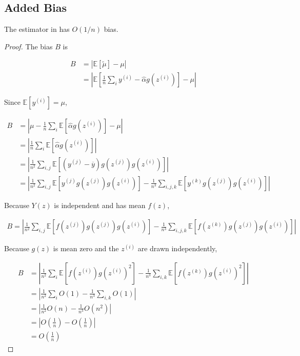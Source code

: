 \subsection{Added Bias}

\begin{prop}[\ref{prop:price:added_bias}]
The estimator in  has $O(1/n)$ bias.
\end{prop}
\begin{proof}

The bias $B$ is

\begin{align}
B &= \left| \mathbb{E}[\widetilde{\mu}] - \mu \right| \\
&= \left| \mathbb{E}[\frac{1}{n} \sum_i y^{(i)} - \hat{\alpha} g(z^{(i)})] - \mu \right|
\end{align}

Since $\mathbb{E}[y^{(i)}] = \mu$,

\begin{align}
B&= \left| \mu - \frac{1}{n} \sum_i \mathbb{E}[\hat{\alpha} g(z^{(i)})] - \mu \right| \\
&=\left| \frac{1}{n} \sum_i \mathbb{E}[\hat{\alpha} g(z^{(i)})] \right| \\
&=\left| \frac{1}{n^2} \sum_{i,j} \mathbb{E}[(y^{(j)} - \overline{y}) g(z^{(j)}) g(z^{(i)})]\right| \\
&=\left| \frac{1}{n^2} \sum_{i,j} \mathbb{E}[y^{(j)} g(z^{(j)}) g(z^{(i)})] - \frac{1}{n^3} \sum_{i,j,k} \mathbb{E}[y^{(k)} g(z^{(j)}) g(z^{(i)})] \right| 
\end{align}

Because $Y(z)$ is independent and has mean $f(z)$,

\begin{align}
B=\left| \frac{1}{n^2} \sum_{i,j} \mathbb{E}[f(z^{(j)}) g(z^{(j)}) g(z^{(i)})] - \frac{1}{n^3} \sum_{i,j,k} \mathbb{E}[f(z^{(k)}) g(z^{(j)}) g(z^{(i)})] \right| 
\end{align}

Because $g(z)$ is mean zero and the $z^{(i)}$ are drawn independently,

\begin{align}
B &= \left| \frac{1}{n^2} \sum_{i} \mathbb{E}[f(z^{(i)}) g(z^{(i)})^2] - \frac{1}{n^3} \sum_{i,k} \mathbb{E}[f(z^{(k)}) g(z^{(i)})^2] \right| \\
&= \left| \frac{1}{n^2} \sum_{i} O(1) - \frac{1}{n^3} \sum_{i,k} O(1) \right| \\
&= \left| \frac{1}{n^2} O(n) - \frac{1}{n^3} O(n^2) \right| \\
&= \left| O \left(\frac{1}{n} \right) - O \left(\frac{1}{n} \right) \right| \\
&= O \left(\frac{1}{n} \right) 
\end{align}


\end{proof}
